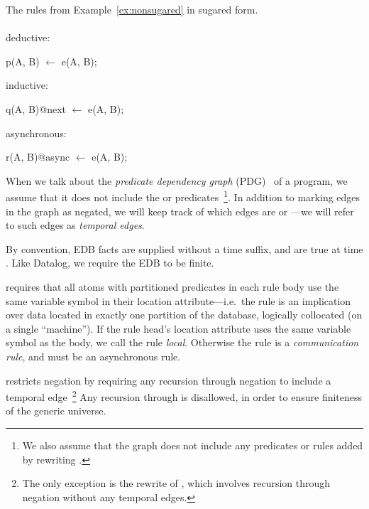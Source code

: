 \begin{example}
\label{ex:sugared}
The rules from Example~\ref{ex:nonsugared} in sugared form.
\\\\
deductive:
\begin{Dedalus}
p(A, B) \(\leftarrow\) e(A, B);
\end{Dedalus}
inductive:
\begin{Dedalus}
q(A, B)@next \(\leftarrow\) e(A, B);
\end{Dedalus}
asynchronous:
\begin{Dedalus}
r(A, B)@async \(\leftarrow\) e(A, B);
\end{Dedalus}
\end{example}

When we talk about the {\em predicate dependency graph} (PDG)~\cite{ullmanbook} of a \lang program, we assume that it does not include the  or  predicates~\footnote{We also assume that the graph does not include any predicates or rules added by rewriting .}.  In addition to marking edges in the graph as negated, we will keep track of which edges are  or ---we will refer to such edges as {\em temporal edges}.


\vspace{1em}
By convention, EDB facts are supplied without a time suffix, and are true at time .  Like Datalog, we require the EDB to be finite.

\vspace{1em}
\lang requires that all atoms with partitioned predicates in each rule body use the same variable symbol in their location attribute---i.e.\ the rule is an implication over data located in exactly one partition of the database, logically collocated (on a single ``machine'').  If the rule head's location attribute uses the same variable symbol as the body, we call the rule {\em local}.  Otherwise the rule is a {\em communication rule}, and must be an asynchronous rule.                                                        

      
\vspace{1em}
\lang restricts negation by requiring any recursion through negation to include a temporal edge~\footnote{The only exception is the rewrite of , which involves recursion through negation without any temporal edges.}  Any recursion through  is disallowed, in order to ensure finiteness of the generic universe.

